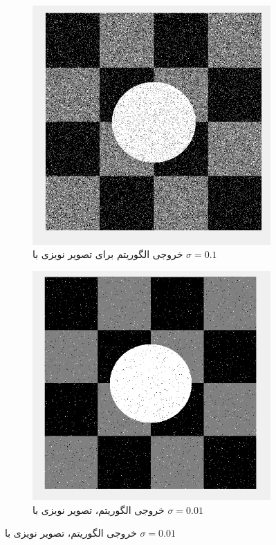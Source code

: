 \documentclass[11.5pt,a4paper]{article}
\begin{document}
\begin{figure}[h]
	\begin{subfigure}{0.3\textwidth}
	\includegraphics[scale=0.3]{Imgs/MRF_S1_BetaV_Res.png}
	\caption{خروجی الگوریتم برای تصویر نویزی با $\sigma=0.1$}
	\end{subfigure}
	\begin{subfigure}{0.3\textwidth}
	\includegraphics[scale=0.3]{Imgs/MRF_S01_Res.png}
	\caption{خروجی الگوریتم، تصویر نویزی با $\sigma=0.01$}

\end{subfigure}
\end{figure}
\end{document}
